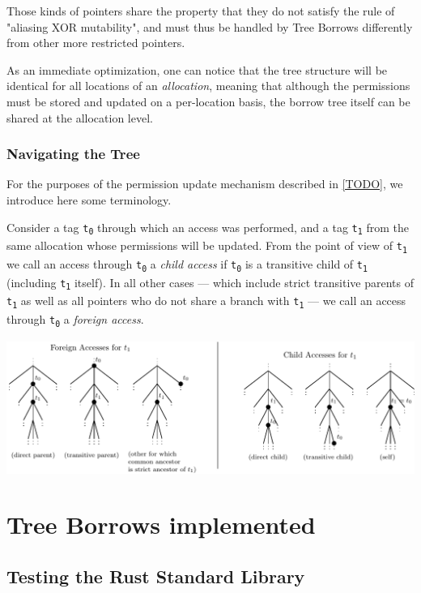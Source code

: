 \documentclass[a4paper,11pt]{article}
\theoremstyle{plain}
\theoremstyle{definition}
\theoremstyle{remark}
\newcommand{\tcode}[1]{\texttt{#1}}
\newcommand{\tsub}[1]{\textsubscript{#1}}
\begin{document}
Those kinds of pointers share the property that they do not satisfy the rule
of "aliasing XOR mutability", and must thus be handled by Tree Borrows differently
from other more restricted pointers.

As an immediate optimization, one can notice that the tree structure will
be identical for all locations of an \textit{allocation}, meaning that although
the permissions must be stored and updated on a per-location basis, the
borrow tree itself can be shared at the allocation level.

\subsubsection{Navigating the Tree}

For the purposes of the permission update mechanism described in \ref{TODO},
we introduce here some terminology.

Consider a tag \tcode{t\tsub{0}} through which an access was performed, and a tag
\tcode{t\tsub{1}} from the same allocation whose permissions will be updated. From the point
of view of \tcode{t\tsub{1}} we call an access through \tcode{t\tsub{0}} a \textit{child access}
if \tcode{t\tsub{0}} is a transitive child of \tcode{t\tsub{1}} (including \tcode{t\tsub{1}} itself).
In all other cases --- which include strict transitive parents of \tcode{t\tsub{1}} as well as
all pointers who do not share a branch with \tcode{t\tsub{1}} --- we call an access through
\tcode{t\tsub{0}} a \textit{foreign access}.

\includegraphics[width=\textwidth]{../figs/accesses-kinds.pdf}


\section{Tree Borrows implemented}

\subsection{Testing the Rust Standard Library}
\end{document}

